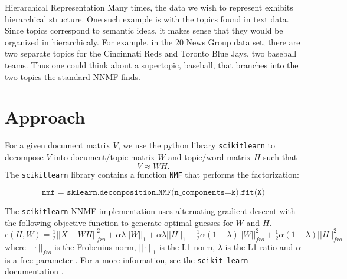 \documentclass[12pt]{pom_thesis}
\begin{document}
\begin{chapter}{Hierarchical Representation}
Many times, the data we wish to represent exhibits hierarchical structure. One such example is with the topics found in text data. Since topics correspond to semantic ideas, it makes sense that they would be organized in hierarchicaly. For example, in the 20 News Group data set, there are two separate topics for the Cincinnati Reds and Toronto Blue Jays, two baseball teams. Thus one could think about a supertopic, baseball, that branches into the two topics the standard NNMF finds.
\section{Approach}
For a given document matrix $V$, we use the python library \texttt{scikitlearn} to decompose $V$ into document/topic matrix $W$ and topic/word matrix $H$ such that $$V \approx WH.$$ The  \texttt{scikitlearn} library contains a function \texttt{NMF} that performs the factorization: 


$$\texttt{nmf = sklearn.decomposition.NMF(n\_components=k).fit(X)}$$


The \texttt{scikitlearn} NNMF implementation uses alternating gradient descent with the following objective function to generate optimal guesses for $W$ and $H$.
$$c(H,W) = \tfrac{1}{2} ||X-WH||_{fro}^2 + \alpha \lambda ||W||_1 + \alpha \lambda ||H||_1 + \tfrac{1}{2} \alpha (1-\lambda) ||W||^2_{fro} + \tfrac{1}{2} \alpha (1-\lambda) ||H||^2_{fro}  $$
where $||\cdot||_{fro}$ is the Frobenius norm, $||\cdot||_{1}$ is the L1 norm, $\lambda$ is the L1 ratio and $\alpha$ is a free parameter \cite{nnmfimp}. For a more information, see the \texttt{scikit learn} documentation \cite{nnmfimp}.


\end{chapter}
\end{document}

